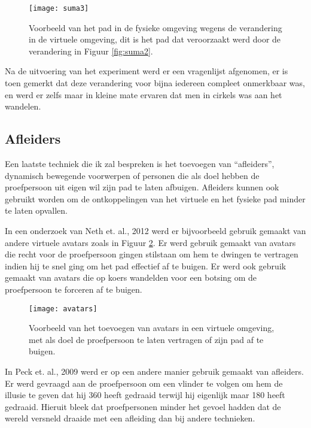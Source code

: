 \begin{figure}[t!]
    \centering
    \texttt{[image: suma3]}
    \caption{Voorbeeld van het pad in de fysieke omgeving wegens de verandering
    in de virtuele omgeving, dit is het pad dat veroorzaakt werd door de 
    verandering in Figuur \ref{fig:suma2}.\cite{suma11}}
    \label{fig:suma3}
\end{figure}

Na de uitvoering van het experiment werd er een vragenlijst afgenomen, er is 
toen gemerkt dat deze verandering voor bijna iedereen compleet onmerkbaar was, en
werd er zelfs maar in kleine mate ervaren dat men in cirkels was aan het 
wandelen.


\subsection{Afleiders} \label{1:distraction}
Een laatste techniek die ik zal bespreken is het toevoegen van ``afleiders'',
dynamisch bewegende voorwerpen of personen die als doel hebben de proefpersoon
uit eigen wil zijn pad te laten afbuigen. Afleiders kunnen ook gebruikt worden
om de ontkoppelingen van het virtuele en het fysieke pad minder te laten 
opvallen.

In een onderzoek van Neth et. al., 2012 \cite{neth12} werd er bijvoorbeeld 
gebruik gemaakt van andere virtuele avatars zoals in Figuur \ref{fig:avatars}.
Er werd gebruik gemaakt van avatars die recht voor de proefpersoon gingen
stilstaan om hem te dwingen te vertragen indien hij te snel ging om het pad
effectief af te buigen. Er werd ook gebruik gemaakt van avatars die op koers
wandelden voor een botsing om de proefpersoon te forceren af te buigen.

\begin{figure}[h!]
    \centering
    \texttt{[image: avatars]}
    \caption{Voorbeeld van het toevoegen van avatars in een virtuele omgeving, 
    met als doel de proefpersoon te laten vertragen of zijn pad af te 
    buigen.\cite{neth12}}
    \label{fig:avatars}
\end{figure}

In Peck et. al., 2009 \cite{peck09} werd er op een andere manier gebruik gemaakt 
van afleiders. Er werd gevraagd aan de proefpersoon om een vlinder te volgen om
hem de illusie te geven dat hij \mbox{360\textdegree} heeft gedraaid terwijl hij 
eigenlijk maar 180\textdegree{} heeft gedraaid. Hieruit bleek dat proefpersonen 
minder het gevoel hadden dat de wereld versneld draaide met een afleiding dan 
bij andere technieken.


